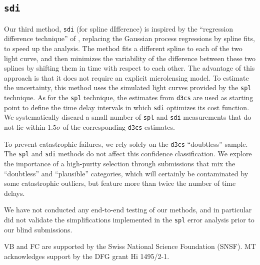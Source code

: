 \documentclass[traditabstract]{aa}
\begin{document}
\subsection{\tt sdi}

Our third method, {\tt sdi} (for spline dIfference) is inspired by the ``regression difference technique'' of \citet{pycs}, replacing the Gaussian process regressions by spline fits, to speed up the analysis. The method fits a different spline to each of the two light curve, and then minimizes the variability of the difference between these two splines by shifting them in time with respect to each other. The advantage of this approach is that it does not require an explicit microlensing model. To estimate the uncertainty, this method uses the simulated light curves provided by the {\tt spl} technique. As for the {\tt spl} technique, the estimates from {\tt d3cs} are used as starting point to define the time delay intervals in which {\tt sdi} optimizes its cost function. We systematically discard a small number of {\tt spl} and {\tt sdi} measurements that do not lie within 1.5$\sigma$ of the corresponding {\tt d3cs} estimates.


\vspace{30pt}

To prevent catastrophic failures, we rely solely on the {\tt d3cs} ``doubtless'' sample. The {\tt spl} and {\tt sdi} methods do not affect this confidence classification. We explore the importance of a high-purity selection through submissions that mix the ``doubtless'' and ``plausible'' categories, which will certainly be contaminated by some catastrophic outliers, but feature more than twice the number of time delays.

We have not conducted any end-to-end testing of our methods, and in particular did not validate the simplifications implemented in the {\tt spl} error analysis prior to our blind submissions. 





\begin{acknowledgements}
VB and FC are supported by the Swiss National Science Foundation (SNSF). MT acknowledges support by the DFG grant Hi 1495/2-1.
\end{acknowledgements}





\end{document}
